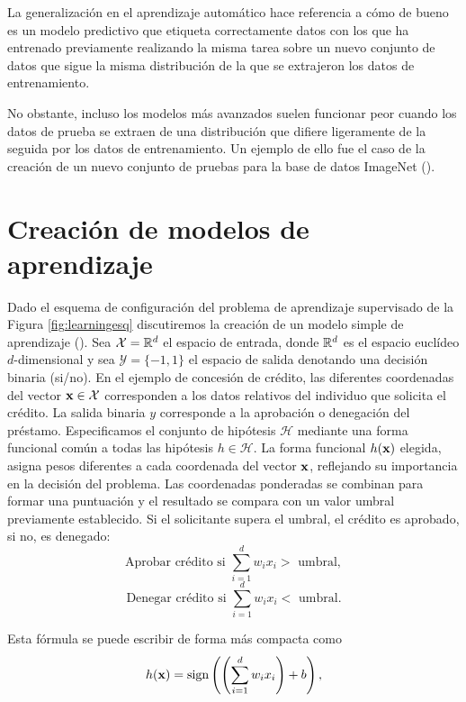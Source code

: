 \documentclass[oneside,openright,titlepage,numbers=noenddot,openany,headinclude,footinclude=true,
cleardoublepage=empty,abstractoff,BCOR=5mm,paper=a4,fontsize=12pt,main=spanish]{scrreprt}
\begin{document}
La generalización en el aprendizaje automático hace referencia a cómo de bueno es un modelo predictivo que etiqueta correctamente datos con los que ha entrenado previamente realizando la misma tarea sobre un nuevo conjunto de datos que sigue la misma distribución de la que se extrajeron los datos de entrenamiento. %

No obstante, incluso los modelos más avanzados suelen funcionar peor cuando los datos de prueba se extraen de una distribución que difiere ligeramente de la seguida por los datos de entrenamiento. Un ejemplo de ello fue el caso de la creación de un nuevo conjunto de pruebas para la base de datos ImageNet (\cite{generalize2019}).

\section{Creación de modelos de aprendizaje}

Dado el esquema de configuración del problema de aprendizaje supervisado de la Figura \ref{fig:learningesq} discutiremos la creación de un modelo simple de aprendizaje (\cite{learning2012}). Sea $\mathcal{X}=\mathbb{R}^d$ el espacio de entrada, donde $\mathbb{R}^d$ es el espacio euclídeo $d$-dimensional y sea $\mathcal{Y}=\{-1,1\}$ el espacio de salida denotando una decisión binaria (si/no). En el ejemplo de concesión de crédito, las diferentes coordenadas del vector $\textbf{x}\in \mathcal{X}$ corresponden a los datos relativos del individuo que solicita el crédito. La salida binaria $y$ corresponde a la aprobación o denegación del préstamo. Especificamos el conjunto de hipótesis $\mathcal{H}$ mediante una forma funcional común a todas las hipótesis $h\in \mathcal{H}$. La forma funcional $h(\textbf{x})$ elegida, asigna pesos diferentes a cada coordenada del vector $\textbf{x}$, reflejando su importancia en la decisión del problema. Las coordenadas ponderadas se combinan para formar una puntuación y el resultado se compara con un valor umbral previamente establecido. Si el solicitante supera el umbral, el crédito es aprobado, si no, es denegado: $$\text{Aprobar crédito si } \sum_{i=1}^d w_ix_i > \text{ umbral},$$ $$\text{Denegar crédito si } \sum_{i=1}^d w_ix_i < \text{ umbral}.$$

Esta fórmula se puede escribir de forma más compacta como 
\begin{equation} \label{eq:sign-6}
h(\textbf{x})=\text{sign}\left(\left( \sum_{i=1}^d w_ix_i\right)+b \right),
\end{equation}
\end{document}
